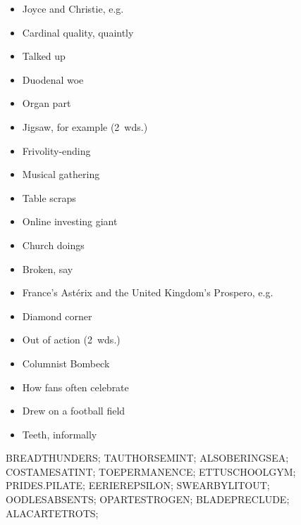{  \item
    \begin{itemize}
      \item
        Joyce and Christie, e.g.
      \item
        Cardinal quality, quaintly
      \item
        Talked up
      \item
        Duodenal woe
      \item
        Organ part
      \item
        Jigsaw, for example (2~wds.)
    \end{itemize}
  \item
    \begin{itemize}
      \item
        Frivolity-ending
      \item
        Musical gathering
      \item
        Table scraps
      \item
        Online investing giant
      \item
        Church doings
    \end{itemize}
  \item
    \begin{itemize}
      \item
        Broken, say
      \item
        France's Ast\'{e}rix and the United Kingdom's Prospero, e.g.
      \item
        Diamond corner
      \item
        Out of action (2~wds.)
    \end{itemize}
  \item
    \begin{itemize}
      \item
        Columnist Bombeck
      \item
        How fans often celebrate
      \item
        Drew on a football field
    \end{itemize}
  \item
    \begin{itemize}
      \item
        Teeth, informally
    \end{itemize}
}{%
  \puzzlerow BREADTHUNDERS;
  \puzzlerow TAUTHORSEMINT;
  \puzzlerow ALSOBERINGSEA;
  \puzzlerow COSTAMESATINT;
  \puzzlerow TOEPERMANENCE;
  \puzzlerow ETTUSCHOOLGYM;
  \puzzlerow PRIDES.PILATE;
  \puzzlerow EERIEREPSILON;
  \puzzlerow SWEARBYLITOUT;
  \puzzlerow OODLESABSENTS;
  \puzzlerow OPARTESTROGEN;
  \puzzlerow BLADEPRECLUDE;
  \puzzlerow ALACARTETROTS;
}
